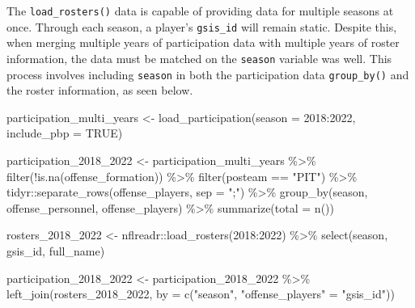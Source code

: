\documentclass[
  letterpaper,
]{krantz}
\newenvironment{Shaded}{\begin{snugshade}}{\end{snugshade}}
\newcommand{\AttributeTok}[1]{\textcolor[rgb]{0.40,0.45,0.13}{#1}}
\newcommand{\ConstantTok}[1]{\textcolor[rgb]{0.56,0.35,0.01}{#1}}
\newcommand{\DecValTok}[1]{\textcolor[rgb]{0.68,0.00,0.00}{#1}}
\newcommand{\FunctionTok}[1]{\textcolor[rgb]{0.28,0.35,0.67}{#1}}
\newcommand{\NormalTok}[1]{\textcolor[rgb]{0.00,0.23,0.31}{#1}}
\newcommand{\OtherTok}[1]{\textcolor[rgb]{0.00,0.23,0.31}{#1}}
\newcommand{\SpecialCharTok}[1]{\textcolor[rgb]{0.37,0.37,0.37}{#1}}
\newcommand{\StringTok}[1]{\textcolor[rgb]{0.13,0.47,0.30}{#1}}
\begin{document}
\begin{tcolorbox}[enhanced jigsaw, colback=white, leftrule=.75mm, breakable, colframe=quarto-callout-tip-color-frame, bottomtitle=1mm, rightrule=.15mm, left=2mm, opacityback=0, bottomrule=.15mm, arc=.35mm, coltitle=black, colbacktitle=quarto-callout-tip-color!10!white, toptitle=1mm, titlerule=0mm, title=\textcolor{quarto-callout-tip-color}{\faLightbulb}\hspace{0.5em}{Tip}, toprule=.15mm, opacitybacktitle=0.6]

The \texttt{load\_rosters()} data is capable of providing data for
multiple seasons at once. Through each season, a player's
\texttt{gsis\_id} will remain static. Despite this, when merging
multiple years of participation data with multiple years of roster
information, the data must be matched on the \texttt{season} variable
was well. This process involves including \texttt{season} in both the
participation data \texttt{group\_by()} and the roster information, as
seen below.

\begin{Shaded}
\begin{Highlighting}[]
\NormalTok{participation\_multi\_years }\OtherTok{\textless{}{-}}
  \FunctionTok{load\_participation}\NormalTok{(}\AttributeTok{season =} \DecValTok{2018}\SpecialCharTok{:}\DecValTok{2022}\NormalTok{, }\AttributeTok{include\_pbp =} \ConstantTok{TRUE}\NormalTok{)}

\NormalTok{participation\_2018\_2022 }\OtherTok{\textless{}{-}}\NormalTok{ participation\_multi\_years }\SpecialCharTok{\%\textgreater{}\%}
  \FunctionTok{filter}\NormalTok{(}\SpecialCharTok{!}\FunctionTok{is.na}\NormalTok{(offense\_formation)) }\SpecialCharTok{\%\textgreater{}\%}
  \FunctionTok{filter}\NormalTok{(posteam }\SpecialCharTok{==} \StringTok{"PIT"}\NormalTok{) }\SpecialCharTok{\%\textgreater{}\%}
\NormalTok{  tidyr}\SpecialCharTok{::}\FunctionTok{separate\_rows}\NormalTok{(offense\_players, }\AttributeTok{sep =} \StringTok{";"}\NormalTok{) }\SpecialCharTok{\%\textgreater{}\%}
  \FunctionTok{group\_by}\NormalTok{(season, offense\_personnel, offense\_players) }\SpecialCharTok{\%\textgreater{}\%}
  \FunctionTok{summarize}\NormalTok{(}\AttributeTok{total =} \FunctionTok{n}\NormalTok{())}

\NormalTok{rosters\_2018\_2022 }\OtherTok{\textless{}{-}}\NormalTok{ nflreadr}\SpecialCharTok{::}\FunctionTok{load\_rosters}\NormalTok{(}\DecValTok{2018}\SpecialCharTok{:}\DecValTok{2022}\NormalTok{) }\SpecialCharTok{\%\textgreater{}\%}
  \FunctionTok{select}\NormalTok{(season, gsis\_id, full\_name)}

\NormalTok{participation\_2018\_2022 }\OtherTok{\textless{}{-}}\NormalTok{ participation\_2018\_2022 }\SpecialCharTok{\%\textgreater{}\%}
  \FunctionTok{left\_join}\NormalTok{(rosters\_2018\_2022,}
            \AttributeTok{by =} \FunctionTok{c}\NormalTok{(}\StringTok{"season"}\NormalTok{, }\StringTok{"offense\_players"} \OtherTok{=} \StringTok{"gsis\_id"}\NormalTok{))}
\end{Highlighting}
\end{Shaded}

\end{tcolorbox}
\end{document}
